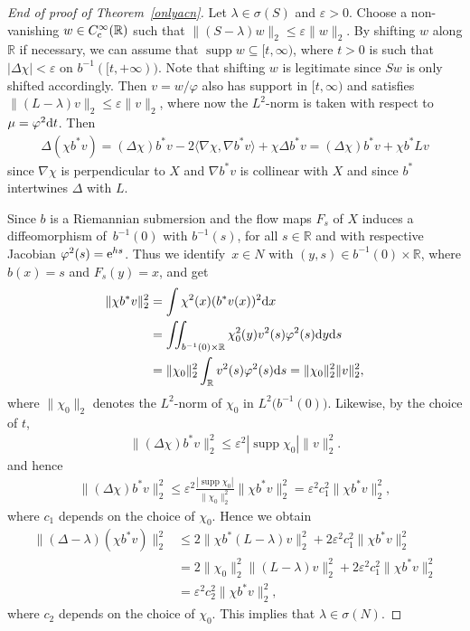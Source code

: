 \documentclass[10pt,a4paper]{amsart}
\numberwithin{equation}{section}
\DeclareMathOperator{\supp}{supp}
\def\R{\mathbb R}
\def\ve{\varepsilon}
\def\vf{\varphi}
\begin{document}
\begin{proof}[End of proof of Theorem~\ref{onlyacn}]
Let $\lambda\in\sigma(S)$ and $\ve>0$.
Choose a non-vanishing $w\in C^\infty_{\rm c}(\R)$ such that $\|(S-\lambda)w\|_2\le\ve\|w\|_2$.
By shifting $w$ along $\R$ if necessary, we can assume that $\supp w\subseteq[t,\infty)$,
where $t>0$ is such that $|\Delta\chi| < \ve$ on $b^{-1}([t,+\infty))$.
Note that shifting $w$ is legitimate since $Sw$ is only shifted accordingly.
Then $v=w/\vf$ also has support in $[t,\infty)$ and satisfies $\|(L-\lambda)v\|_2\le\ve\|v\|_2$,
where now the $L^2$-norm is taken with respect to $\mu=\vf^2{\rm d}t$.
Then
\begin{align*}
	\Delta(\chi b^*v)
	= (\Delta\chi)b^*v - 2\langle\nabla\chi,\nabla b^*v\rangle + \chi\Delta b^*v
	= (\Delta\chi)b^*v + \chi b^*Lv
\end{align*}
since $\nabla\chi$ is perpendicular to $X$ and $\nabla b^*v$ is collinear with $X$
and since $b^*$ intertwines $\Delta$ with $L$.

Since $b$ is a Riemannian submersion and the flow maps $F_s$ of $X$ induces
a diffeomorphism of~$b^{-1}(0)$ with $b^{-1}(s)$,
for all $s\in\R$ and with respective Jacobian $\vf^2(s)={\rm e}^{hs}$.
Thus we identify~$x\in N$ with $(y,s)\in b^{-1}(0)\times\R$, where $b(x)=s$ and $F_s(y)=x$,
and get
\begin{align*}%
	\|\chi b^*v\|_2^2
	&= \int \chi^2(x)(b^*v(x))^2{\rm d}x \\
	&= \iint_{b^{-1}(0)\times\R}\chi_0^2(y)v^2(s)\vf^2(s){\rm d}y{\rm d}s \\
	&= \|\chi_0\|_2^2 \int_\R v^2(s)\vf^2(s){\rm d}s
	= \|\chi_0\|_2^2 \|v\|_2^2,
\end{align*}
where $\|\chi_0\|_2$ denotes the $L^2$-norm of $\chi_0$ in $L^2\bigl(b^{-1}(0)\bigr)$.
Likewise, by the choice of $t$,
\begin{align*}%
	\|(\Delta\chi)b^*v\|_2^2
	\le \ve^2|\supp\chi_0| \|v\|_2^2.
\end{align*}
and hence
\begin{align*}%
	\|(\Delta\chi)b^*v\|_2^2
	\le \ve^2\frac{|\supp\chi_0|}{ \|\chi_0\|_2^2}\|\chi b^*v\|_2^2
	= \ve^2c_1^2\|\chi b^*v\|_2^2,
\end{align*}
where $c_1$ depends on the choice of $\chi_0$.
Hence we obtain
\begin{align*}%
	\|(\Delta-\lambda)(\chi b^*v)\|_2^2
	&\le 2\|\chi b^*(L-\lambda)v\|_2^2 + 2\ve^2c_1^2\|\chi b^*v\|_2^2 \\
	&= 2\|\chi_0\|_2^2 \|(L-\lambda)v\|_2^2 + 2\ve^2c_1^2\|\chi b^*v\|_2^2 \\
	&= \ve^2c_2^2\|\chi b^*v\|_2^2,
\end{align*}
where $c_2$ depends on the choice of $\chi_0$.
This implies that $\lambda\in\sigma(N)$.
\end{proof}
\end{document}
